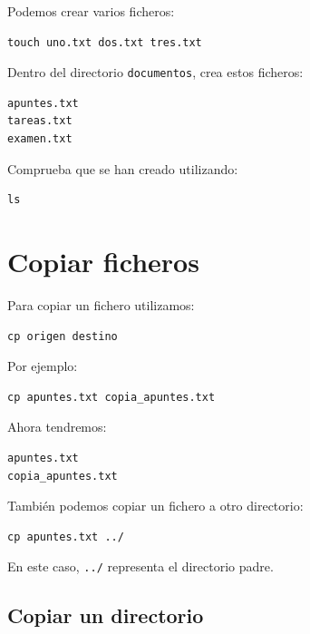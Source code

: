 \documentclass[11pt,a4paper]{article}
\begin{document}
\noindent Podemos crear varios ficheros:


\begin{lstlisting}
touch uno.txt dos.txt tres.txt
\end{lstlisting}


\begin{ejercicio}
Dentro del directorio \texttt{documentos}, crea estos ficheros:


\begin{lstlisting}
apuntes.txt
tareas.txt
examen.txt
\end{lstlisting}


Comprueba que se han creado utilizando:


\begin{lstlisting}
ls
\end{lstlisting}
\end{ejercicio}


\section{Copiar ficheros}


Para copiar un fichero utilizamos:


\begin{lstlisting}
cp origen destino
\end{lstlisting}


\noindent Por ejemplo:


\begin{lstlisting}
cp apuntes.txt copia_apuntes.txt
\end{lstlisting}


\noindent Ahora tendremos:


\begin{lstlisting}
apuntes.txt
copia_apuntes.txt
\end{lstlisting}


\noindent También podemos copiar un fichero a otro directorio:


\begin{lstlisting}
cp apuntes.txt ../
\end{lstlisting}


\noindent En este caso, \texttt{../} representa el directorio padre.


\subsection{Copiar un directorio}
\end{document}

